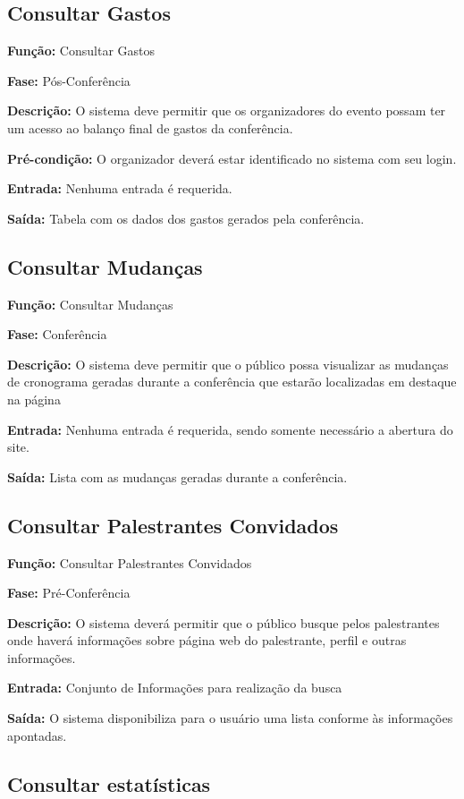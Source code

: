 \documentclass[letter]{article}
\begin{document}
\subsection{Consultar Gastos}
\textbf{Função:}  Consultar Gastos

\textbf{Fase:}  Pós-Conferência

\textbf{Descrição: } O sistema deve permitir que os organizadores do evento possam ter um acesso ao balanço final de gastos da conferência.

\textbf{Pré-condição:}  O organizador deverá estar identificado no sistema com seu login.

\textbf{Entrada: } Nenhuma entrada é requerida.

\textbf{Saída:}  Tabela com os dados dos gastos gerados pela conferência.

\subsection{Consultar Mudanças}

\textbf{Função:}  Consultar Mudanças

\textbf{Fase:}  Conferência

\textbf{Descrição:}  O sistema deve permitir que o público possa visualizar as mudanças de cronograma geradas durante a conferência que estarão localizadas em destaque na página

\textbf{Entrada:}  Nenhuma entrada é requerida, sendo somente necessário a abertura do site.

\textbf{Saída:}  Lista com as mudanças geradas durante a conferência.

\subsection{Consultar Palestrantes Convidados}

\textbf{Função:}  Consultar Palestrantes Convidados

\textbf{Fase:}  Pré-Conferência

\textbf{Descrição:}  O sistema deverá permitir que o público busque pelos palestrantes onde haverá informações sobre página web do palestrante, perfil e outras informações.

\textbf{Entrada:}  Conjunto de Informações para realização da busca

\textbf{Saída:}  O sistema disponibiliza para o usuário uma lista conforme às informações apontadas.


\subsection{Consultar estatísticas}
\end{document}
